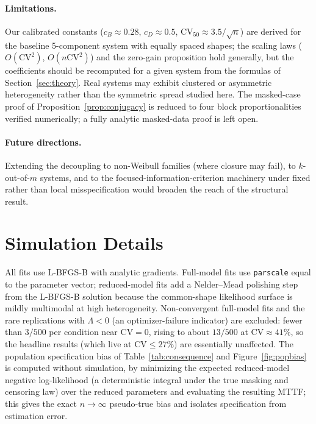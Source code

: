 \documentclass[11pt]{article}
\newcommand{\CV}{\mathrm{CV}}
\begin{document}
\paragraph{Limitations.} Our calibrated constants ($c_B \approx 0.28$, $c_D \approx 0.5$, $\CV_{50}\approx 3.5/\sqrt{n}$) are derived for the baseline 5-component system with equally spaced shapes; the scaling laws ($O(\CV^2)$, $O(n\CV^2)$) and the zero-gain proposition hold generally, but the coefficients should be recomputed for a given system from the formulas of Section~\ref{sec:theory}. Real systems may exhibit clustered or asymmetric heterogeneity rather than the symmetric spread studied here. The masked-case proof of Proposition~\ref{prop:conjugacy} is reduced to four block proportionalities verified numerically; a fully analytic masked-data proof is left open.

\paragraph{Future directions.} Extending the decoupling to non-Weibull families (where closure may fail), to $k$-out-of-$m$ systems, and to the focused-information-criterion machinery under fixed rather than local misspecification would broaden the reach of the structural result.

\appendix

\section{Simulation Details}
\label{app:sim}

All fits use L-BFGS-B \citep{byrd1995} with analytic gradients. Full-model fits use \texttt{parscale} equal to the parameter vector; reduced-model fits add a Nelder--Mead polishing step from the L-BFGS-B solution because the common-shape likelihood surface is mildly multimodal at high heterogeneity. Non-convergent full-model fits and the rare replications with $\Lambda < 0$ (an optimizer-failure indicator) are excluded: fewer than $3/500$ per condition near $\CV = 0$, rising to about $13/500$ at $\CV \approx 41\%$, so the headline results (which live at $\CV \leq 27\%$) are essentially unaffected. The population specification bias of Table~\ref{tab:consequence} and Figure~\ref{fig:popbias} is computed without simulation, by minimizing the expected reduced-model negative log-likelihood (a deterministic integral under the true masking and censoring law) over the reduced parameters and evaluating the resulting MTTF; this gives the exact $n\to\infty$ pseudo-true bias and isolates specification from estimation error.
\end{document}
